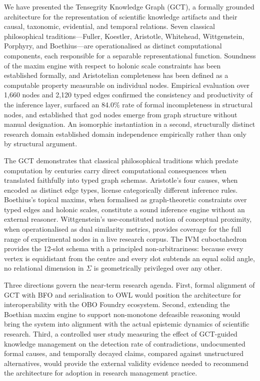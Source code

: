 \documentclass{iosart2x}
\begin{document}
We have presented the Tensegrity Knowledge Graph (GCT), a formally grounded architecture for the representation of scientific knowledge artifacts and their causal, taxonomic, evidential, and temporal relations. Seven classical philosophical traditions---Fuller, Koestler, Aristotle, Whitehead, Wittgenstein, Porphyry, and Boethius---are operationalised as distinct computational components, each responsible for a separable representational function. Soundness of the maxim engine with respect to holonic scale constraints has been established formally, and Aristotelian completeness has been defined as a computable property measurable on individual nodes. Empirical evaluation over 1,660 nodes and 2,120 typed edges confirmed the consistency and productivity of the inference layer, surfaced an 84.0\% rate of formal incompleteness in structural nodes, and established that god nodes emerge from graph structure without manual designation. An isomorphic instantiation in a second, structurally distinct research domain established domain independence empirically rather than only by structural argument.

The GCT demonstrates that classical philosophical traditions which predate computation by centuries carry direct computational consequences when translated faithfully into typed graph schemas. Aristotle's four causes, when encoded as distinct edge types, license categorically different inference rules. Boethius's topical maxims, when formalised as graph-theoretic constraints over typed edges and holonic scales, constitute a sound inference engine without an external reasoner. Wittgenstein's use-constituted notion of conceptual proximity, when operationalised as dual similarity metrics, provides coverage for the full range of experimental nodes in a live research corpus. The IVM cuboctahedron provides the 12-slot schema with a principled non-arbitrariness: because every vertex is equidistant from the centre and every slot subtends an equal solid angle, no relational dimension in $\Sigma$ is geometrically privileged over any other.

Three directions govern the near-term research agenda. First, formal alignment of GCT with BFO and serialisation to OWL would position the architecture for interoperability with the OBO Foundry ecosystem. Second, extending the Boethian maxim engine to support non-monotone defeasible reasoning would bring the system into alignment with the actual epistemic dynamics of scientific research. Third, a controlled user study measuring the effect of GCT-guided knowledge management on the detection rate of contradictions, undocumented formal causes, and temporally decayed claims, compared against unstructured alternatives, would provide the external validity evidence needed to recommend the architecture for adoption in research management practice.
\end{document}
